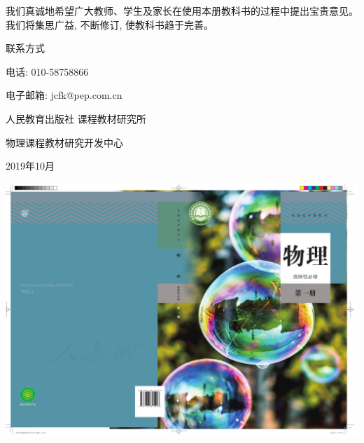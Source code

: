 \documentclass[10pt]{article}
\begin{document}
我们真诚地希望广大教师、学生及家长在使用本册教科书的过程中提出宝贵意见。我们将集思广益, 不断修订, 使教科书趋于完善。

联系方式

电话: 010-58758866

电子邮箱: jcfk@pep.com.cn

人民教育出版社 课程教材研究所

物理课程教材研究开发中心

2019年10月

\begin{center}
\includegraphics[max width=1.0\textwidth]{images/01910e4c-ebb8-7d2c-8f2f-2375bc1d2d12_130_849513.jpg}
\end{center}
\end{document}
